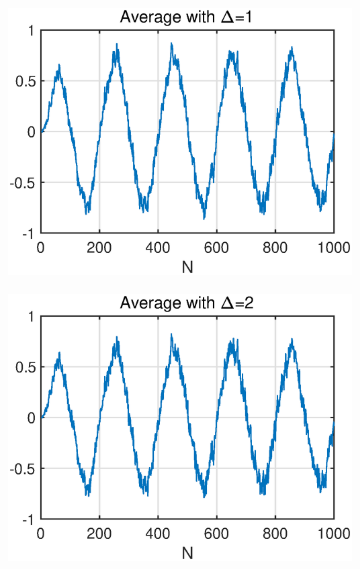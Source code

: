 \begin{figure}[htb]
    \hspace{-0.4cm}
    \begin{subfigure}[b]{0.26\textwidth}
     \centering
     \includegraphics[width=\textwidth]{fig/23/23a2.eps}
    \end{subfigure}
    \hspace{-0.4cm}
    \begin{subfigure}[b]{0.26\textwidth}
     \centering
     \includegraphics[width=\textwidth]{fig/23/23a4.eps}
    \end{subfigure} 
    \hspace{-0.4cm} 
    \begin{subfigure}[b]{0.26\textwidth}

\end{subfigure}
\end{figure}
